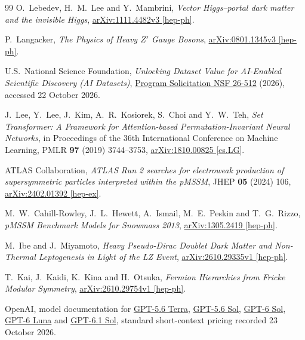 \begin{thebibliography}{99}
O.~Lebedev, H.~M.~Lee and Y.~Mambrini,
\emph{Vector Higgs--portal dark matter and the invisible Higgs},
\href{https://arxiv.org/abs/1111.4482v3}{arXiv:1111.4482v3 [hep-ph]}.

P.~Langacker,
\emph{The Physics of Heavy $Z'$ Gauge Bosons},
\href{https://arxiv.org/abs/0801.1345v3}{arXiv:0801.1345v3 [hep-ph]}.

U.S.~National Science Foundation,
\emph{Unlocking Dataset Value for AI-Enabled Scientific Discovery (AI Datasets)},
\href{https://www.nsf.gov/funding/opportunities/ai-datasets-unlocking-dataset-value-ai-enabled-scientific-discovery/nsf26-512/solicitation}{Program Solicitation NSF 26-512} (2026), accessed 22 October 2026.

J.~Lee, Y.~Lee, J.~Kim, A.~R.~Kosiorek, S.~Choi and Y.~W.~Teh,
\emph{Set Transformer: A Framework for Attention-based Permutation-Invariant Neural Networks},
in Proceedings of the 36th International Conference on Machine Learning,
PMLR \textbf{97} (2019) 3744--3753,
\href{https://arxiv.org/abs/1810.00825}{arXiv:1810.00825 [cs.LG]}.

ATLAS Collaboration,
\emph{ATLAS Run 2 searches for electroweak production of supersymmetric particles interpreted within the pMSSM},
JHEP \textbf{05} (2024) 106,
\href{https://arxiv.org/abs/2402.01392}{arXiv:2402.01392 [hep-ex]}.

M.~W.~Cahill-Rowley, J.~L.~Hewett, A.~Ismail, M.~E.~Peskin and T.~G.~Rizzo,
\emph{pMSSM Benchmark Models for Snowmass 2013},
\href{https://arxiv.org/abs/1305.2419}{arXiv:1305.2419 [hep-ph]}.

M.~Ibe and J.~Miyamoto,
\emph{Heavy Pseudo-Dirac Doublet Dark Matter and Non-Thermal Leptogenesis in Light of the LZ Event},
\href{https://arxiv.org/abs/2610.29335v1}{arXiv:2610.29335v1 [hep-ph]}.

T.~Kai, J.~Kaidi, K.~Kina and H.~Otsuka,
\emph{Fermion Hierarchies from Fricke Modular Symmetry},
\href{https://arxiv.org/abs/2610.29754v1}{arXiv:2610.29754v1 [hep-ph]}.

OpenAI, model documentation for
\href{https://developers.openai.com/api/docs/models/gpt-5.6-terra}{GPT-5.6 Terra},
\href{https://developers.openai.com/api/docs/models/gpt-5.6-sol}{GPT-5.6 Sol},
\href{https://developers.openai.com/api/docs/models/gpt-6-sol}{GPT-6 Sol},
\href{https://developers.openai.com/api/docs/models/gpt-6-luna}{GPT-6 Luna} and
\href{https://developers.openai.com/api/docs/models/gpt-6.1-sol}{GPT-6.1 Sol},
standard short-context pricing recorded 23 October 2026.

\end{thebibliography}

